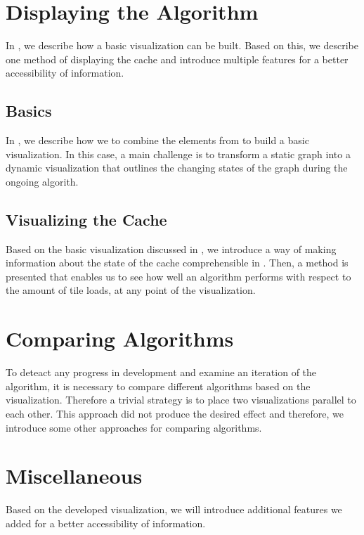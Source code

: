 \documentclass
[
    paper = a4,
    pagesize,
    12 pt,
    oneside,                       %
    open = right,
    DIV = calc,
    BCOR = 0 mm,                   %
    bibtotoc
]
{scrbook}
\begin{document}
\section{Displaying the Algorithm}

In , we describe how a basic visualization can be built.
Based on this, we describe one method of displaying the cache and introduce multiple features for a better accessibility of information.


\subsection{Basics}

In , we describe how we to combine the elements from  to build a basic visualization.
In this case, a main challenge is to transform a static graph into a dynamic visualization that outlines the changing states of the graph during the ongoing algorith.


\subsection{Visualizing the Cache} \label{pre_cache}

Based on the basic visualization discussed in , we introduce a way of making information about the state of the cache comprehensible in .
Then, a method is presented that enables us to see how well an algorithm performs with respect to the amount of tile loads, at any point of the visualization.


\section{Comparing Algorithms}

To deteact any progress in development and examine an iteration of the algorithm, it is necessary to compare different algorithms based on the visualization.
Therefore a trivial strategy is to place two visualizations parallel to each other.
This approach did not produce the desired effect and therefore, we introduce some other approaches for comparing algorithms.


\section{Miscellaneous}

Based on the developed visualization, we will introduce additional features we added for a better accessibility of information.
\end{document}
